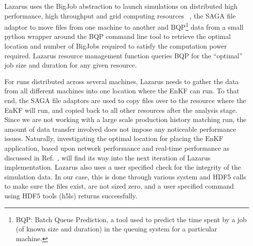 \documentclass{acm_proc_article-sp}
\newcommand{\up}{\vspace*{-0.3em}}
\begin{document}


Lazarus uses the BigJob abstraction to launch simulations on
distributed high performance, high throughput and grid computing
resources ~\cite{gmac}, the SAGA file adaptor to move files from one
machine to another and BQP\footnote{BQP: Batch Queue Prediction, a tool
used to predict the time spent by a job (of known size and duration)
in the queuing system for a particular machine.} data from a small python wrapper around the
BQP command line tool to retrieve the optimal location and number of
BigJobs required to satisfy the computation power required. Lazarus
resource management function queries BQP for the ``optimal'' job size
and duration for any given resource.

For runs distributed across several machines, Lazarus needs to gather
the data from all different machines into one location where the EnKF
can run. To that end, the SAGA file adaptors are used to copy files
over to the resource where the EnKF will run, and copied back to all
other resources after the analysis stage. Since we are not working
with a large scale production history matching run, the amount of data
transfer involved does not impose any noticeable performance
issues. Naturally, investigating the optimal location for placing the
EnKF application, based upon network performance and real-time
performance as discussed in Ref.~\cite{escience07}, will find its way
into the next iteration of Lazarus implementation.  Lazarus also uses
a user specified check for the integrity of the simulation data. In
our case, this is done through various system and HDF5 calls to make
sure the files exist, are not sized zero, and a user specified command
using HDF5 tools (h5ls) returns successfully.
 
\end{document}
